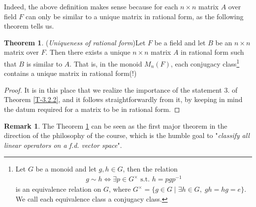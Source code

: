 \documentclass[letterpaper,11pt,twoside]{article}
\theoremstyle{definition}
\theoremstyle{definition}
\newtheorem{theorem}[proposition]{Theorem}
\theoremstyle{definition}
\newtheorem{remark}[proposition]{\textbf{Remark}}
\theoremstyle{definition}
\theoremstyle{definition}
\theoremstyle{definition}
\theoremstyle{remark}
\theoremstyle{definition}
\begin{document}
	Indeed, the above definition makes sense because for each $ n\times n $ matrix $ A $ over field $ F $ can only be similar to a unique matrix in rational form, as the following theorem tells us.
	\begin{theorem}(\textit{Uniqueness of rational form})\label{T-3.2.8}
		Let $ F $ be a field and let $ B $ be an $ n\times n $ matrix over $ F $. Then there exists a unique $ n\times n $ matrix $ A $ in rational form such that $ B $ is similar to $ A $. That is, in the monoid $ M_{n}(F) $, each conjugacy class\footnote{Let $ G $ be a monoid and let $ g,h\in G $, then the relation \begin{align*}
				g\sim h\iff \exists p\in G^{\times} \text{ s.t. } h = pgp^{-1}
		\end{align*}
		is an equivalence relation on $ G $, where $ G^{\times} = \{g\in G\;\vert\; \exists h\in G,\; gh=hg =e\} $. We call each equivalence class a conjugacy class.	
} contains a unique matrix in rational form(!)
	\end{theorem}
	\begin{proof}
		It is in this place that we realize the importance of the statement 3. of Theorem \ref{T-3.2.2}, and it follows straightforwardly from it, by keeping in mind the datum required for a matrix to be in rational form.
	\end{proof}
    \begin{remark}\label{R-3.2.9}
    	The Theorem \ref{T-3.2.8} can be seen as the first major theorem in the direction of the philosophy of the course, which is the humble goal to "\textit{classify all linear operators on a f.d. vector space}".
    \end{remark}
    
\end{document}
